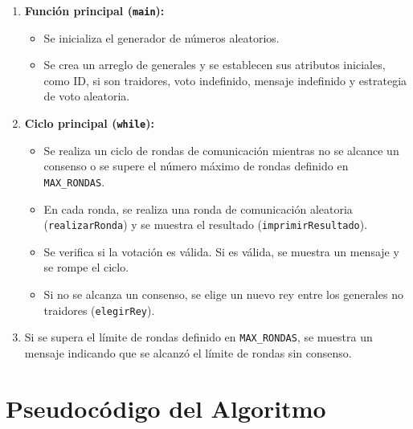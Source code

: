 \documentclass[a4paper,12pt]{article}
\begin{document}
\begin{enumerate}
  \item \textbf{Función principal (\texttt{main}):}
  \begin{itemize}
      \item Se inicializa el generador de números aleatorios.
      \item Se crea un arreglo de generales y se establecen sus atributos iniciales, como ID, si son traidores, voto indefinido, mensaje indefinido y estrategia de voto aleatoria.
  \end{itemize}
  
  \item \textbf{Ciclo principal (\texttt{while}):}
  \begin{itemize}
      \item Se realiza un ciclo de rondas de comunicación mientras no se alcance un consenso o se supere el número máximo de rondas definido en \texttt{MAX\_RONDAS}.
      \item En cada ronda, se realiza una ronda de comunicación aleatoria (\texttt{realizarRonda}) y se muestra el resultado (\texttt{imprimirResultado}).
      \item Se verifica si la votación es válida. Si es válida, se muestra un mensaje y se rompe el ciclo.
      \item Si no se alcanza un consenso, se elige un nuevo rey entre los generales no traidores (\texttt{elegirRey}).
  \end{itemize}
  
  \item Si se supera el límite de rondas definido en \texttt{MAX\_RONDAS}, se muestra un mensaje indicando que se alcanzó el límite de rondas sin consenso.
\end{enumerate}

\section*{Pseudocódigo del Algoritmo}
\end{document}
